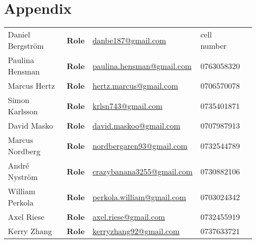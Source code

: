 \section*{Appendix}

\renewcommand{\arraystretch}{1.5} %
\begin{tabular}{lllll}
  Daniel Bergström & \textbf{Role} & \href{mailto:danbe187@gmail.com}{danbe187@gmail.com} & cell number \\
  Paulina Hensman & \textbf{Role} & \href{mailto:paulina.hensman@gmail.com}{paulina.hensman@gmail.com} & 0763058320 \\
  Marcus Hertz & \textbf{Role} & \href{mailto:hertz.marcus@gmail.com}{hertz.marcus@gmail.com} & 0706570078 \\
  Simon Karlsson & \textbf{Role} & \href{mailto:krlsn743@gmail.com}{krlsn743@gmail.com} & 0735401871 \\
  David Masko & \textbf{Role} & \href{mailto:david.maskoo@gmail.com}{david.maskoo@gmail.com} & 0707987913 \\
  Marcus Nordberg & \textbf{Role} & \href{mailto:nordbergaren93@gmail.com}{nordbergaren93@gmail.com} & 0732544789 \\
  André Nyström & \textbf{Role} & \href{mailto:crazybanana3255@gmail.com}{crazybanana3255@gmail.com} & 0730882106 \\
  William Perkola & \textbf{Role} & \href{mailto:perkola.william@gmail.com}{perkola.william@gmail.com} & 0703024342 \\
  Axel Riese & \textbf{Role} & \href{mailto:axel.riese@gmail.com}{axel.riese@gmail.com} & 0732455919 \\
  Kerry Zhang & \textbf{Role} & \href{mailto:kerryzhang92@gmail.com}{kerryzhang92@gmail.com} & 0737633721 \\
\end{tabular}

